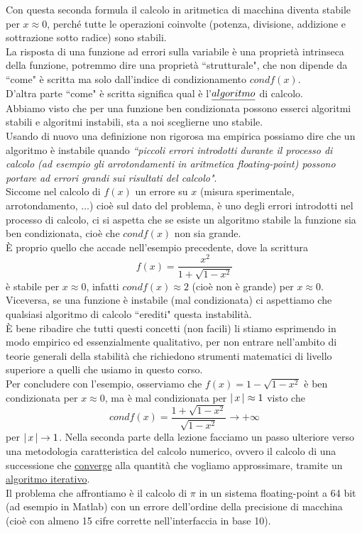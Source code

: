 Con questa seconda formula il calcolo in aritmetica di macchina diventa stabile per $x \approx 0$, perché tutte le operazioni coinvolte (potenza, divisione, addizione e sottrazione sotto radice) sono stabili.\\
La risposta di una funzione ad errori sulla variabile è una proprietà intrinseca della funzione, potremmo dire una proprietà ``strutturale", che non dipende da ``come" è scritta ma solo dall'indice di condizionamento $cond f(x)$.\\ 
D'altra parte ``come" è scritta significa qual è l'$\uline{algoritmo}$ di calcolo.\\
Abbiamo visto che per una funzione ben condizionata possono esserci algoritmi stabili e algoritmi instabili, sta a noi sceglierne uno stabile.\\ 
Usando di nuovo una definizione non rigorosa ma empirica possiamo dire che un algoritmo è instabile quando \textit{``piccoli errori introdotti durante il processo di calcolo (ad esempio gli arrotondamenti in aritmetica floating-point) possono portare ad errori grandi sui risultati del calcolo"}.\\
\newline
Siccome nel calcolo di $f(x)$ un errore su $x$ (misura sperimentale, arrotondamento, $\dotsc$) cioè sul dato del problema, è uno degli errori introdotti nel processo di calcolo, ci si aspetta che se esiste un algoritmo stabile la funzione sia ben condizionata, cioè che $condf(x)$ non sia grande.\\ 
È proprio quello che accade nell'esempio precedente, dove la scrittura 
\[f(x) = \frac{x^2}{1+\sqrt{1-x^2}}\] è stabile per $x\approx 0$, infatti $condf(x)\approx 2$ (cioè non è grande) per $x\approx 0$.\\
Viceversa, se una funzione è instabile (mal condizionata) ci aspettiamo che qualsiasi algoritmo di calcolo ``erediti" questa instabilità.\\
È bene ribadire che tutti questi concetti (non facili) li stiamo esprimendo in modo empirico ed essenzialmente qualitativo, per non entrare nell'ambito di teorie generali della stabilità che richiedono strumenti matematici di livello superiore a quelli che usiamo in questo corso.\\
\newline
Per concludere con l'esempio, osserviamo che $f(x) = 1-\sqrt{1-x^2}$ è ben condizionata per $x \approx 0$, ma è mal condizionata per $\lvert\,x\,\rvert \approx 1$ visto che \[condf(x) = \frac{1+\sqrt{1-x^2}}{\sqrt{1-x^2}} \to +\infty \] 
per $\lvert\,x\,\rvert \to 1$.\newline \newline
Nella seconda parte della lezione facciamo un passo ulteriore verso una metodologia caratteristica del calcolo numerico, ovvero il calcolo di una successione che \uline{converge} alla quantità che vogliamo approssimare, tramite un \uline{algoritmo iterativo}.\\
Il problema che affrontiamo è il calcolo di $\pi$ in un sistema floating-point a 64 bit (ad esempio in Matlab) con un errore dell'ordine della precisione di 
macchina (cioè con almeno 15 cifre corrette nell'interfaccia in base 10).


